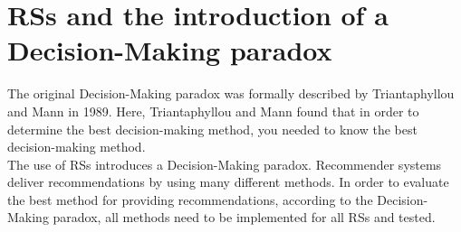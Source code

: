 
\TODO{}

\section{RSs and the introduction of a Decision-Making paradox}

The original Decision-Making paradox was formally described by Triantaphyllou and Mann in 1989. Here, Triantaphyllou and Mann found that in order to determine the best decision-making method, you needed to know the best decision-making method.\\

The use of RSs introduces a Decision-Making paradox. Recommender systems deliver recommendations by using many different methods. In order to evaluate the best method for providing recommendations, according to the Decision-Making paradox, all methods need to be implemented for all RSs and tested.\\




